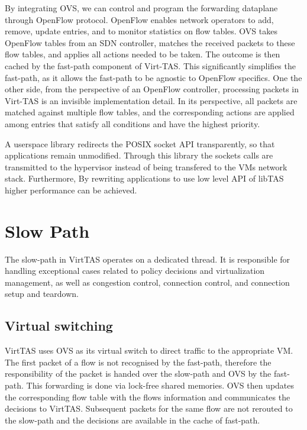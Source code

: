 By integrating OVS, we can control and program the forwarding dataplane through 
OpenFlow protocol. OpenFlow enables network operators to add, remove, update entries,
and to monitor statistics on flow tables. OVS takes OpenFlow tables from an SDN
controller, matches the received packets to these flow tables, and applies 
all actions needed to be taken. The outcome is then cached by the fast-path component
of Virt-TAS. This significantly simplifies the fast-path, as it allows the fast-path to 
be agnostic to OpenFlow specifics. One the other side, from the perspective of an OpenFlow 
controller,  processing packets in Virt-TAS is an invisible implementation detail. In its 
perspective, all packets are matched against multiple flow tables, and the corresponding 
actions are applied among entries that satisfy all conditions and have the highest priority.



A userspace library redirects the POSIX socket API transparently, so that applications 
remain unmodified. Through this library the sockets calls are transmitted to the 
hypervisor instead of being transfered to the VMs network stack. Furthermore, 
By rewriting applications to use low level API of libTAS higher performance can be achieved.

\section{Slow Path}

The slow-path in VirtTAS operates on a dedicated thread. It is responsible for handling exceptional 
cases related to policy decisions and virtualization management, as well as congestion control, 
connection control, and connection setup and teardown.


\subsection{Virtual switching}
VirtTAS uses OVS as its virtual switch to direct traffic to the appropriate VM.
The first packet of a flow is not recognised by the fast-path, therefore the 
responsibility of the packet is handed over the slow-path and OVS by the fast-path.
This forwarding is done via lock-free shared memories. OVS then updates the corresponding 
flow table with the flows information and communicates the 
decisions to VirtTAS. Subsequent packets for the same flow are not rerouted to the slow-path 
and the decisions are available in the cache of fast-path. 

